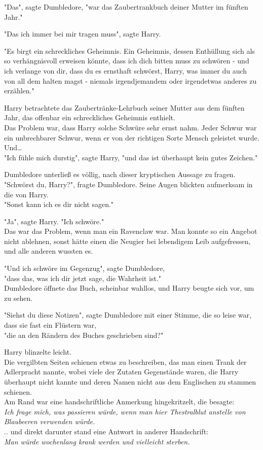 {"Das", sagte Dumbledore, "war das Zaubertrankbuch deiner Mutter im fünften Jahr."

"Das ich immer bei mir tragen muss", sagte Harry.

"Es birgt ein schreckliches Geheimnis. Ein Geheimnis, dessen Enthüllung sich als so verhängnisvoll erweisen könnte, dass ich dich bitten muss zu schwören - und ich verlange von dir, dass du es ernsthaft schwörst, Harry, was immer du auch von all dem halten magst - niemals irgendjemandem oder irgendetwas anderes zu erzählen."

Harry betrachtete das Zaubertränke-Lehrbuch seiner Mutter aus dem fünften Jahr, das offenbar ein schreckliches Geheimnis enthielt.\\ Das Problem war, dass Harry solche Schwüre sehr ernst nahm. Jeder Schwur war ein unbrechbarer Schwur, wenn er von der richtigen Sorte Mensch geleistet wurde.\\ Und…\\ "Ich fühle mich durstig", sagte Harry, "und das ist überhaupt kein gutes Zeichen."

Dumbledore unterließ es völlig, nach dieser kryptischen Aussage zu fragen.\\ "Schwörst du, Harry?", fragte Dumbledore. Seine Augen blickten aufmerksam in die von Harry.\\ "Sonst kann ich es dir nicht sagen."

"Ja", sagte Harry. "Ich schwöre."\\ Das war das Problem, wenn man ein Ravenclaw war. Man konnte so ein Angebot nicht ablehnen, sonst hätte einen die Neugier bei lebendigem Leib aufgefressen, und alle anderen wussten es.

"Und ich schwöre im Gegenzug", sagte Dumbledore,\\ "dass das, was ich dir jetzt sage, die Wahrheit ist."\\ Dumbledore öffnete das Buch, scheinbar wahllos, und Harry beugte sich vor, um zu sehen.

"Siehst du diese Notizen", sagte Dumbledore mit einer Stimme, die so leise war, dass sie fast ein Flüstern war,\\ "die an den Rändern des Buches geschrieben sind?"

Harry blinzelte leicht.\\ Die vergilbten Seiten schienen etwas zu beschreiben, das man einen Trank der Adlerpracht nannte, wobei viele der Zutaten Gegenstände waren, die Harry überhaupt nicht kannte und deren Namen nicht aus dem Englischen zu stammen schienen.\\ Am Rand war eine handschriftliche Anmerkung hingekritzelt, die besagte:\\ \emph{Ich frage mich, was passieren würde, wenn man hier Thestralblut anstelle von Blaubeeren verwenden würde.}\\ .. und direkt darunter stand eine Antwort in anderer Handschrift:\\ \emph{Man würde wochenlang krank werden und vielleicht sterben.}

}
